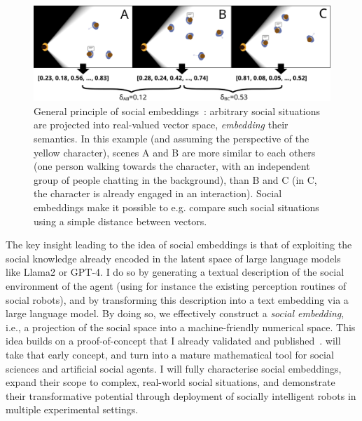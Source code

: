 \begin{figure}[H]
    \centering
    \includegraphics[width=0.9\linewidth]{figs/social-embeddings}
    \caption{General principle of social embeddings~\cite{lemaignan2024social}: arbitrary social situations
    are projected into real-valued vector space, \emph{embedding} their
    semantics. In this example (and assuming the perspective of the yellow
    character), scenes A and B  are more similar to each others (one person
    walking towards the character, with an independent group of people chatting
    in the background), than B and C (in C, the character is already engaged in
    an interaction).  Social embeddings make it possible to e.g. compare such
    social situations using a simple distance between vectors.}

    \label{fig:social-embeddings}
\end{figure}


The key insight leading to the idea of social embeddings is that of exploiting
the social knowledge already encoded in the latent space of large language
models like Llama2 or GPT-4. I do so by generating a textual
description of the social environment of the agent (using for instance the
existing perception routines of social robots), and by transforming this
description into a text embedding via a large language model.  By doing so, we
effectively construct a \emph{social embedding}, i.e., a projection of the
social space into a machine-friendly numerical space.  This idea builds on a
proof-of-concept that I already validated and
published~\cite{lemaignan2024social}. \project will take that early concept, and
turn into a mature mathematical tool for social sciences and artificial social
agents. I will fully characterise social embeddings, expand their scope to
complex, real-world social situations, and demonstrate their transformative
potential through deployment of socially intelligent robots in multiple
experimental settings.

